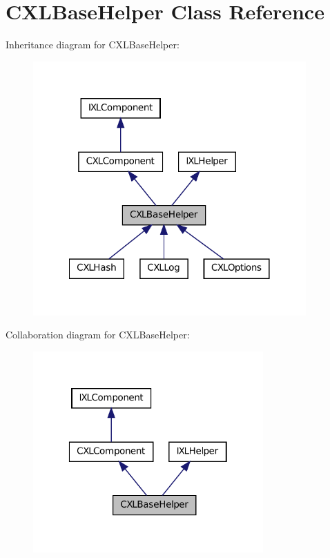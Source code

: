 \hypertarget{classCXLBaseHelper}{
\section{CXLBaseHelper Class Reference}
\label{classCXLBaseHelper}
}


Inheritance diagram for CXLBaseHelper:\nopagebreak
\begin{figure}[H]
\begin{center}
\leavevmode
\includegraphics[width=296pt]{classCXLBaseHelper__inherit__graph}
\end{center}
\end{figure}


Collaboration diagram for CXLBaseHelper:\nopagebreak
\begin{figure}[H]
\begin{center}
\leavevmode
\includegraphics[width=250pt]{classCXLBaseHelper__coll__graph}
\end{center}
\end{figure}

